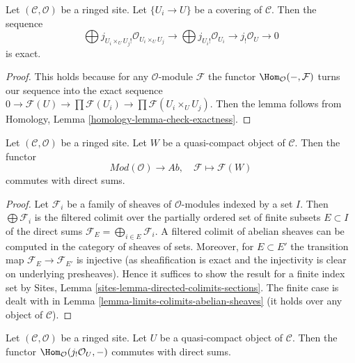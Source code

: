 \begin{lemma}
\label{lemma-covering-gives-surjection}
Let $(\mathcal{C}, \mathcal{O})$ be a ringed site. Let $\{U_i \to U\}$
be a covering of $\mathcal{C}$. Then the sequence
$$
\bigoplus j_{U_i \times_U U_j!}\mathcal{O}_{U_i \times_U U_j} \to
\bigoplus j_{U_i!}\mathcal{O}_{U_i} \to j_!\mathcal{O}_U \to 0
$$
is exact.
\end{lemma}

\begin{proof}
This holds because for any $\mathcal{O}$-module $\mathcal{F}$ the functor
$\Hom_\mathcal{O}(-, \mathcal{F})$ turns our sequence into the exact sequence
$0 \to \mathcal{F}(U) \to \prod \mathcal{F}(U_i) \to
\prod \mathcal{F}(U_i \times_U U_j)$. Then the lemma follows from
Homology, Lemma \ref{homology-lemma-check-exactness}.
\end{proof}

\begin{lemma}
\label{lemma-sections-over-quasi-compact}
Let $(\mathcal{C}, \mathcal{O})$ be a ringed site. Let $W$ be a quasi-compact
object of $\mathcal{C}$. Then the functor
$$
\textit{Mod}(\mathcal{O}) \longrightarrow \textit{Ab},\quad
\mathcal{F} \longmapsto \mathcal{F}(W)
$$
commutes with direct sums.
\end{lemma}

\begin{proof}
Let $\mathcal{F}_i$ be a family of sheaves of $\mathcal{O}$-modules
indexed by a set $I$. Then $\bigoplus \mathcal{F}_i$ is the filtered
colimit over the partially ordered set of finite subsets
$E \subset I$ of the direct sums
$\mathcal{F}_E = \bigoplus_{i \in E} \mathcal{F}_i$.
A filtered colimit of abelian sheaves can be computed in the
category of sheaves of sets. Moreover, for $E \subset E'$ the transition map
$\mathcal{F}_E \to \mathcal{F}_{E'}$ is injective (as sheafification
is exact and the injectivity is clear on underlying presheaves).
Hence it suffices to show the result for a finite index set by
Sites, Lemma \ref{sites-lemma-directed-colimits-sections}.
The finite case is dealt with in
Lemma \ref{lemma-limits-colimits-abelian-sheaves}
(it holds over any object of $\mathcal{C}$).
\end{proof}

\begin{lemma}
\label{lemma-quasi-compact-hom-from}
Let $(\mathcal{C}, \mathcal{O})$ be a ringed site. Let $U$ be a quasi-compact
object of $\mathcal{C}$. Then the functor
$\Hom_\mathcal{O}(j_!\mathcal{O}_U, -)$ commutes with direct sums.
\end{lemma}

